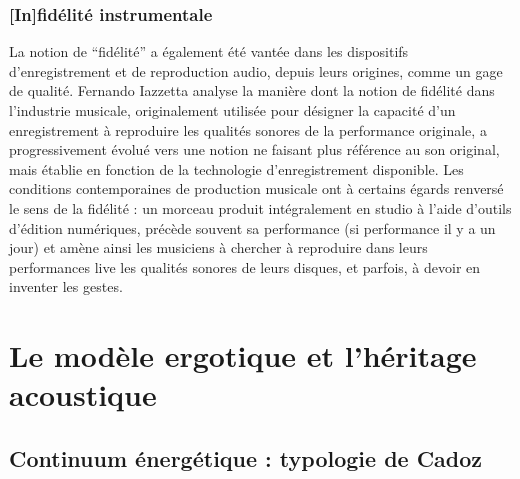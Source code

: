 \subsubsection{[In]fidélité instrumentale}

\noindent La notion de ``fidélité'' a également été vantée dans les dispositifs d'enregistrement et de reproduction audio, depuis leurs origines, comme un gage de qualité. Fernando Iazzetta \cite{iazzetta_meaning_2000} analyse la manière dont la notion de fidélité dans l'industrie musicale, originalement utilisée pour désigner la capacité d'un enregistrement à reproduire les qualités sonores de la performance originale, a progressivement évolué vers une notion ne faisant plus référence au son original, mais établie en fonction de la technologie d'enregistrement disponible. Les conditions contemporaines de production musicale ont à certains égards renversé le sens de la fidélité : un morceau produit intégralement en studio à l'aide d'outils d'édition numériques, précède souvent sa performance (si performance il y a un jour) et amène ainsi les musiciens à chercher à reproduire dans leurs performances live les qualités sonores de leurs disques, et parfois, à devoir en inventer les gestes.


\section{Le modèle ergotique et l'héritage acoustique}
\label{sec:gesture:ergotic}

\subsection{Continuum énergétique : typologie de Cadoz}

